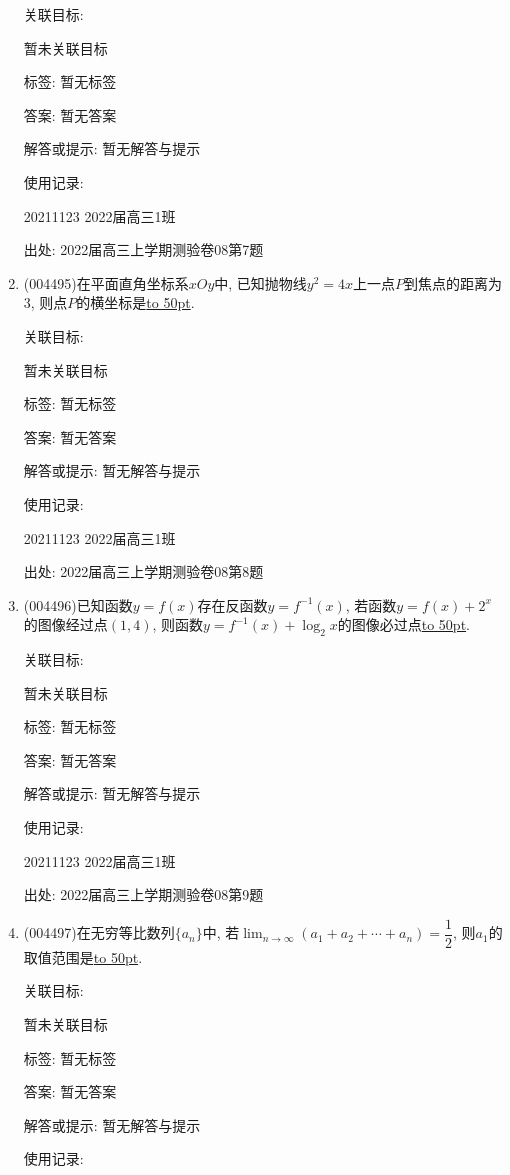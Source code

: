 \documentclass[10pt,a4paper]{article}
\newcommand{\blank}[1]{\underline{\hbox to #1pt{}}}
\begin{document}
\begin{enumerate}[1.]
关联目标:

暂未关联目标



标签: 暂无标签

答案: 暂无答案

解答或提示: 暂无解答与提示

使用记录:

20211123	2022届高三1班	


出处: 2022届高三上学期测验卷08第7题
\item { (004495)}在平面直角坐标系$xOy$中, 已知抛物线$y^2=4x$上一点$P$到焦点的距离为$3$, 则点$P$的横坐标是\blank{50}.


关联目标:

暂未关联目标



标签: 暂无标签

答案: 暂无答案

解答或提示: 暂无解答与提示

使用记录:

20211123	2022届高三1班	


出处: 2022届高三上学期测验卷08第8题
\item { (004496)}已知函数$y=f(x)$存在反函数$y=f^{-1}(x)$, 若函数$y=f(x)+2^x$的图像经过点$(1,4)$, 则函数$y=f^{-1}(x)+\log_2x$的图像必过点\blank{50}.


关联目标:

暂未关联目标



标签: 暂无标签

答案: 暂无答案

解答或提示: 暂无解答与提示

使用记录:

20211123	2022届高三1班	


出处: 2022届高三上学期测验卷08第9题
\item { (004497)}在无穷等比数列$\{a_n\}$中, 若$\displaystyle\lim_{n\to \infty}(a_1+a_2+\cdots +a_n)=\dfrac 12$, 则$a_1$的取值范围是\blank{50}.


关联目标:

暂未关联目标



标签: 暂无标签

答案: 暂无答案

解答或提示: 暂无解答与提示

使用记录:


\end{enumerate}
\end{document}
